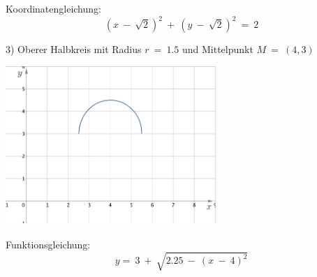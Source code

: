 Koordinatengleichung:
\[(x \ - \ \sqrt 2)^2 \ + \ (y \ - \ \sqrt 2)^2 \ = \ 2 \]


3)
Oberer Halbkreis mit Radius $ r \ = \ 1.5 $ und Mittelpunkt $ M \ = \ (4 , 3) $

\begin{center}
\includegraphics[width=0.6\textwidth]{img/Kreis3.png}
\end{center}
Funktionsgleichung: 
\[y = \ 3 \ + \ \sqrt{ 2.25 \ - \ (x \ - \ 4)^2} \]
